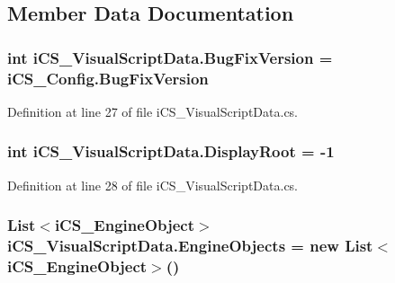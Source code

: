 \subsection{Member Data Documentation}
\hypertarget{classi_c_s___visual_script_data_ab44363b835e38ff3935b6741b76f8848}{
\subsubsection[{Bug\+Fix\+Version}]{\setlength{\rightskip}{0pt plus 5cm}int i\+C\+S\+\_\+\+Visual\+Script\+Data.\+Bug\+Fix\+Version = i\+C\+S\+\_\+\+Config.\+Bug\+Fix\+Version}}\label{classi_c_s___visual_script_data_ab44363b835e38ff3935b6741b76f8848}


Definition at line 27 of file i\+C\+S\+\_\+\+Visual\+Script\+Data.\+cs.

\hypertarget{classi_c_s___visual_script_data_a3e2dbb7f40f92c174114866ab3586160}{
\subsubsection[{Display\+Root}]{\setlength{\rightskip}{0pt plus 5cm}int i\+C\+S\+\_\+\+Visual\+Script\+Data.\+Display\+Root = -\/1}}\label{classi_c_s___visual_script_data_a3e2dbb7f40f92c174114866ab3586160}


Definition at line 28 of file i\+C\+S\+\_\+\+Visual\+Script\+Data.\+cs.

\hypertarget{classi_c_s___visual_script_data_a7b6508437f306912bfb94c51b066e67c}{
\subsubsection[{Engine\+Objects}]{\setlength{\rightskip}{0pt plus 5cm}List$<${\bf i\+C\+S\+\_\+\+Engine\+Object}$>$ i\+C\+S\+\_\+\+Visual\+Script\+Data.\+Engine\+Objects = new List$<${\bf i\+C\+S\+\_\+\+Engine\+Object}$>$()}}\label{classi_c_s___visual_script_data_a7b6508437f306912bfb94c51b066e67c}


